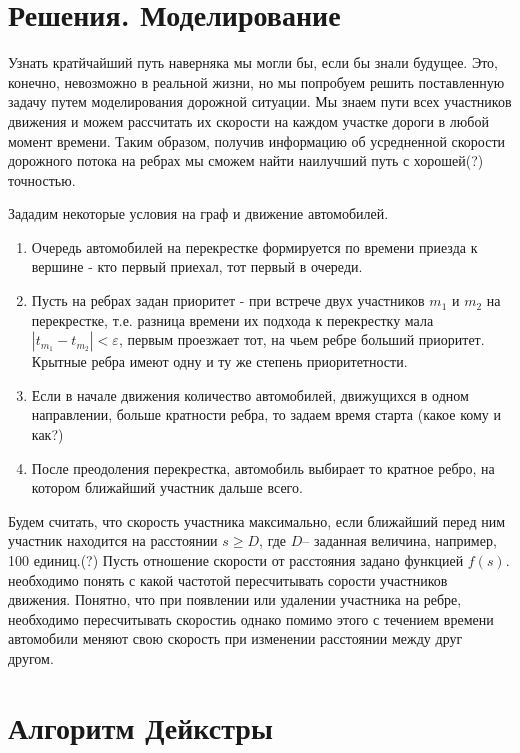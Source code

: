 \documentclass[12pt, a4paper]{article}
\begin{document}
\newpage
\section*{Решения. Моделирование}

Узнать кратйчайший путь наверняка мы могли бы, если бы знали будущее. Это, конечно, невозможно в реальной жизни, но мы попробуем решить поставленную задачу путем моделирования дорожной ситуации. Мы знаем пути всех участников движения и можем рассчитать их скорости на каждом участке дороги в любой момент времени. Таким образом, получив информацию об усредненной скорости дорожного потока на ребрах мы сможем найти наилучший путь с хорошей(?) точностью.

Зададим некоторые условия на граф и движение автомобилей. 

\begin{enumerate}
	\item Очередь автомобилей на перекрестке формируется по времени приезда к вершине - кто первый приехал, тот первый в очереди.
	\item Пусть на ребрах задан приоритет - при встрече двух участников $ m_1 $ и $ m_2 $ на перекрестке, т.е. разница времени их подхода к перекрестку мала $ | t_{m_1} - t_{m_2} | < \varepsilon $, первым проезжает тот, на чьем ребре больший приоритет. Крытные ребра имеют одну и ту же степень приоритетности. 
	\item Если в начале движения количество автомобилей, движущихся в одном направлении, больше кратности ребра, то задаем время старта (какое кому и как?)
	\item После преодоления перекрестка, автомобиль выбирает то кратное ребро, на котором ближайший участник дальше всего.
\end{enumerate}

Будем считать, что скорость участника максимально, если ближайший перед ним участник находится на расстоянии $ s \geq D $, где $ D $-- заданная величина, например, 100 единиц.(?) Пусть отношение скорости от расстояния задано функцией $ f(s) $. необходимо понять с какой частотой пересчитывать сорости участников движения. Понятно, что при появлении или удалении участника на ребре, необходимо пересчитывать скоростиь однако помимо этого с течением времени автомобили меняют свою скорость при изменении расстоянии между друг другом.




\newpage
\section*{Алгоритм Дейкстры}
\end{document}
